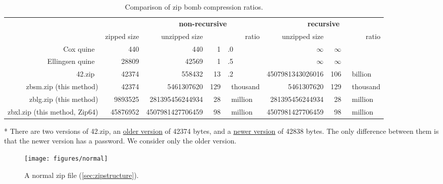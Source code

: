 \documentclass[letterpaper,twocolumn,10pt]{article}
\begin{document}
\begin{table*}
\centering
\begin{threeparttable}
\setlength{\tabcolsep}{0.45em}
\begin{tabular}{rr|rr@{}l|rr@{}l}
&
&
\multicolumn{3}{c|}{\textbf{non-recursive}} &
\multicolumn{3}{c}{\textbf{recursive}}
\\
&
zipped size &
unzipped size &
\multicolumn{2}{r|}{ratio\phantom{~thousand}} &
unzipped size &
\multicolumn{2}{r}{ratio\phantom{~thousand}}
\\
Cox quine~\cite{cox} &
\num{440} &
\num{440} &
\num{1}&.0 &
$\infty$ &
$\infty$&
\\
Ellingsen quine~\cite{ellingsen} &
\num{28809} &
\num{42569} &
\num{1}&.5 &
$\infty$ &
$\infty$&
\\
42.zip~\cite{42.zip} &
\num{42374}\tnote{*} &
\num{558432} &
\num{13}&.2 &
\num{4507981343026016} &
106&~billion
\\
zbsm.zip (this method) &
\num{42374} &
\num{5461307620} &
129&~thousand &
\num{5461307620} &
129&~thousand
\\
zblg.zip (this method) &
\num{9893525} &
\num{281395456244934} &
28&~million &
\num{281395456244934} &
28&~million
\\
zbxl.zip (this method, Zip64)&
\num{45876952} &
\num{4507981427706459} &
98&~million &
\num{4507981427706459} &
98&~million
\end{tabular}
\caption{
Comparison of zip bomb compression ratios.
}
\label{tab:comparison}
\begin{tablenotes}
\item [*]
There are two versions of 42.zip,
an \href{https://web.archive.org/web/20120222083624/http://www.unforgettable.dk/}{older version} of \num{42374} bytes,
and a \href{https://web.archive.org/web/20120301154142/http://www.unforgettable.dk/}{newer version} of \num{42838} bytes.
The only difference between them is that the newer version has a password.
We consider only the older version.
\end{tablenotes}
\end{threeparttable}
\end{table*}

\begin{figure*}
\texttt{[image: figures/normal]}
\caption{
A normal zip file
(\autoref{sec:zipstructure}).
}
\label{fig:normal}
\end{figure*}
\end{document}
